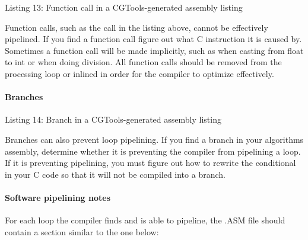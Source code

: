 \begin{DoxyCode}{0}
\end{DoxyCode}
  Listing 13\+: Function call in a C\+G\+Tools-\/generated assembly listing

Function calls, such as the call in the listing above, cannot be effectively pipelined. If you find a function call figure out what C instruction it is caused by. Sometimes a function call will be made implicitly, such as when casting from float to int or when doing division. All function calls should be removed from the processing loop or inlined in order for the compiler to optimize effectively.

\hypertarget{a00832_subsubsection__branches_}{}\paragraph{Branches}\label{a00832_subsubsection__branches_}



\begin{DoxyCode}{0}
\end{DoxyCode}
  Listing 14\+: Branch in a C\+G\+Tools-\/generated assembly listing

Branches can also prevent loop pipelining. If you find a branch in your algorithm\textquotesingle{}s assembly, determine whether it is preventing the compiler from pipelining a loop. If it is preventing pipelining, you must figure out how to rewrite the conditional in your C code so that it will not be compiled into a branch.

\hypertarget{a00832_subsubsection__software_pipelining_notes_}{}\paragraph{Software pipelining notes}\label{a00832_subsubsection__software_pipelining_notes_}
 For each loop the compiler finds and is able to pipeline, the .A\+SM file should contain a section similar to the one below\+:

